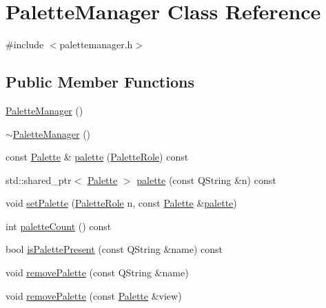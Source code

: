 \hypertarget{class_palette_manager}{}\section{Palette\+Manager Class Reference}
\label{class_palette_manager}


{\ttfamily \#include $<$palettemanager.\+h$>$}

\subsection*{Public Member Functions}
\begin{DoxyCompactItemize}
\item 
\mbox{\hyperlink{class_palette_manager_a32e23cb5e0fe38b37a18732412d58526}{Palette\+Manager}} ()
\item 
\mbox{\hyperlink{class_palette_manager_a90acc7c21ba8ef53b2315d52610dda45}{$\sim$\+Palette\+Manager}} ()
\item 
const \mbox{\hyperlink{class_palette}{Palette}} \& \mbox{\hyperlink{class_palette_manager_a88b16180037ad2acf0254c6d9b9ef90a}{palette}} (\mbox{\hyperlink{palettemanager_8h_adf4610684920d9165d0d74c1ea45b269}{Palette\+Role}}) const
\item 
std\+::shared\+\_\+ptr$<$ \mbox{\hyperlink{class_palette}{Palette}} $>$ \mbox{\hyperlink{class_palette_manager_acd35262852c9eb8005aa7a0a8aed4795}{palette}} (const Q\+String \&n) const
\item 
void \mbox{\hyperlink{class_palette_manager_a55561ab522befd15cf8719417025a00e}{set\+Palette}} (\mbox{\hyperlink{palettemanager_8h_adf4610684920d9165d0d74c1ea45b269}{Palette\+Role}} n, const \mbox{\hyperlink{class_palette}{Palette}} \&\mbox{\hyperlink{class_palette_manager_a88b16180037ad2acf0254c6d9b9ef90a}{palette}})
\item 
int \mbox{\hyperlink{class_palette_manager_a9ff118bc551f5c109bf31d1b2151cbec}{palette\+Count}} () const
\item 
bool \mbox{\hyperlink{class_palette_manager_ac16ee980a0b6ef56829a8b66a4211a83}{is\+Palette\+Present}} (const Q\+String \&name) const
\item 
void \mbox{\hyperlink{class_palette_manager_a5ec728fa0e293780cb1f9cf0b9256cd3}{remove\+Palette}} (const Q\+String \&name)
\item 
void \mbox{\hyperlink{class_palette_manager_abd43d46715021de5b0ce13669c0c0ecd}{remove\+Palette}} (const \mbox{\hyperlink{class_palette}{Palette}} \&view)
\end{DoxyCompactItemize}
